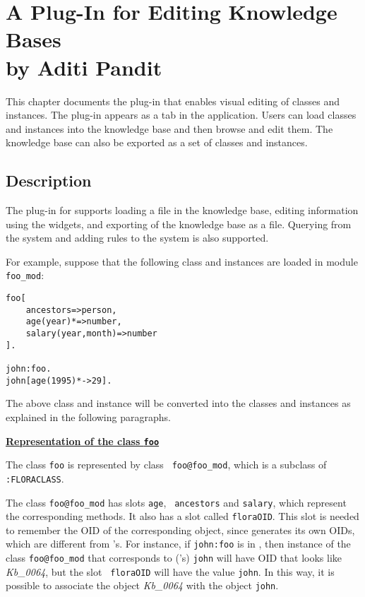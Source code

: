 

    \chapter[A \Protege Plug-In for Editing  \FLORA Knowledge Bases]{A \Protege Plug-In for Editing  \FLORA Knowledge Bases\\
      {by Aditi Pandit}}

    This chapter documents the \Protege plug-in that enables visual editing of
    \FLORA classes and instances. The plug-in appears as a tab in the \Protege
    application. Users can load \FLORA classes and
    instances into the \Protege knowledge base and then browse and edit them.
    The \Protege knowledge base can also be exported as a set of
    \fl classes and instances.

\section{Description}

The \Protege plug-in for \FLORA supports loading a \FLORA file in
the \Protege knowledge base, editing information using the \Protege
widgets, and exporting of the \Protege knowledge base as a \FLORA
file. Querying from the \Protege system and adding rules to the
\FLORA system is also supported.

For example, suppose that the following \FLORA class and instances
are loaded in module {\tt foo\_mod}:

\begin{verbatim}
foo[
    ancestors=>person,
    age(year)*=>number,
    salary(year,month)=>number
].

john:foo.
john[age(1995)*->29].
\end{verbatim}

The above \FLORA class and instance will be converted into the
\Protege classes and instances as explained in the following
paragraphs.

\underline{{\bf Representation of the class {\tt foo}}}

 The \fl class {\tt foo} is represented by \Protege class {\tt
foo@foo\_mod}, which is a subclass of {\tt :FLORACLASS}.

The \Protege class {\tt foo@foo\_mod} has slots {\tt age}, {\tt
  ancestors} and {\tt salary}, which represent the corresponding \fl
methods. It also has a slot called {\tt floraOID}. This slot is
needed to remember the OID of the corresponding \FLORA object, since
\Protege generates its own OIDs, which are different from \FLORA's.
For instance, if {\tt john:foo} is in \FLORA, then \Protege instance
of the \Protege class {\tt foo@foo\_mod} that corresponds to
(\FLORA's) {\tt john} will have \Protege OID that looks like
\emph{Kb\_0064}, but the slot {\tt
  floraOID} will have the value {\tt john}. In this way, it is possible
to associate the \Protege object \emph{Kb\_0064} with the \FLORA object
{\tt john}.


